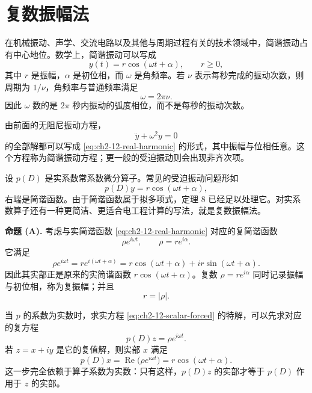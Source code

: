 \section{复数振幅法}

在机械振动、声学、交流电路以及其他与周期过程有关的技术领域中，简谐振动占有中心地位。数学上，简谐振动可以写成
\begin{equation}
 y(t)=r\cos(\omega t+\alpha),
 \qquad r\ge0,
 \label{eq:ch2-12-real-harmonic}
\end{equation}
其中 \(r\) 是振幅，\(\alpha\) 是初位相，而 \(\omega\) 是角频率。若 \(\nu\) 表示每秒完成的振动次数，则周期为 \(1/\nu\)，角频率与普通频率满足
\begin{equation}
 \omega=2\pi\nu.
 \label{eq:ch2-12-frequency-relation}
\end{equation}
因此 \(\omega\) 数的是 \(2\pi\) 秒内振动的弧度相位，而不是每秒的振动次数。

由前面的无阻尼振动方程，
\begin{equation}
 \ddot y+\omega^2y=0
 \label{eq:ch2-12-harmonic-oscillator}
\end{equation}
的全部解都可以写成 \eqref{eq:ch2-12-real-harmonic} 的形式，其中振幅与位相任意。这个方程称为简谐振动方程；更一般的受迫振动则会出现非齐次项。

设 \(p(D)\) 是实系数常系数微分算子。常见的受迫振动问题形如
\begin{equation}
 p(D)y=r\cos(\omega t+\alpha),
 \label{eq:ch2-12-scalar-forced}
\end{equation}
右端是简谐函数。由于简谐函数属于拟多项式，定理 8 已经足以处理它。对实系数算子还有一种更简洁、更适合电工程计算的写法，就是复数振幅法。

\medskip
\noindent\textbf{命题 (A).}
考虑与实简谐函数 \eqref{eq:ch2-12-real-harmonic} 对应的复简谐函数
\begin{equation}
 \rho e^{i\omega t},
 \qquad
 \rho=re^{i\alpha}.
 \label{eq:ch2-12-complex-harmonic}
\end{equation}
它满足
\begin{equation}
 \rho e^{i\omega t}
 =re^{i(\omega t+\alpha)}
 =r\cos(\omega t+\alpha)+ir\sin(\omega t+\alpha).
 \label{eq:ch2-12-complex-harmonic-real-part}
\end{equation}
因此其实部正是原来的实简谐函数 \(r\cos(\omega t+\alpha)\)。复数 \(\rho=re^{i\alpha}\) 同时记录振幅与初位相，称为复振幅；并且
\[
 r=|\rho|.
\]

当 \(p\) 的系数为实数时，求实方程 \eqref{eq:ch2-12-scalar-forced} 的特解，可以先求对应的复方程
\begin{equation}
 p(D)z=\rho e^{i\omega t}.
 \label{eq:ch2-12-complex-forced}
\end{equation}
若 \(z=x+iy\) 是它的复值解，则实部 \(x\) 满足
\[
 p(D)x=\operatorname{Re}\bigl(\rho e^{i\omega t}\bigr)
 =r\cos(\omega t+\alpha).
\]
这一步完全依赖于算子系数为实数：只有这样，\(p(D)z\) 的实部才等于 \(p(D)\) 作用于 \(z\) 的实部。

